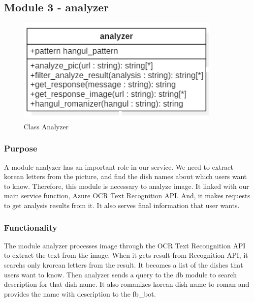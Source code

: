 \FloatBarrier


\subsection{Module 3 - analyzer}



\begin{figure}[htbp]
\centerline{\includegraphics[width=\linewidth]{./pictures/class_analyzer}}
\caption{Class Analyzer}
\label{fig:class_analyzer}
\end{figure}
\FloatBarrier

\subsubsection {Purpose}

A module analyzer has an important role in our service. We need to extract korean letters from the picture, and find the dish names about which users want to know. Therefore, this module is necessary to analyze image. It linked with our main service function, Azure OCR Text Recognition API. And, it makes requests to get analysis results from it. It also serves final information that user wants. 

\subsubsection {Functionality}

The module analyzer processes image through the OCR Text Recongnition API to extract the text from the image. When it gets result from Recognition API, it searchs only krorean letters from the result. It becomes a list of the dishes that users want to know. Then analyzer sends a query to the db module to search description for that dish name. It also romanizes korean dish name to roman and provides the name with description to the fb\_bot.

